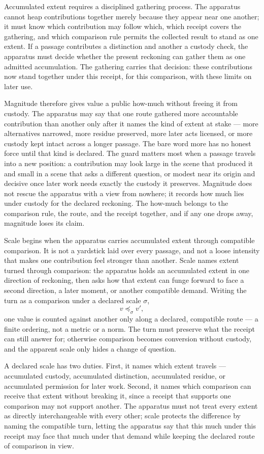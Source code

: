 Accumulated extent requires a disciplined gathering process. The apparatus cannot heap contributions together merely because they appear near one another; it must know which contribution may follow which, which receipt covers the gathering, and which comparison rule permits the collected result to stand as one extent. If a passage contributes a distinction and another a custody check, the apparatus must decide whether the present reckoning can gather them as one admitted accumulation. The gathering carries that decision: these contributions now stand together under this receipt, for this comparison, with these limits on later use.

Magnitude therefore gives value a public how-much without freeing it from custody. The apparatus may say that one route gathered more accountable contribution than another only after it names the kind of extent at stake --- more alternatives narrowed, more residue preserved, more later acts licensed, or more custody kept intact across a longer passage. The bare word more has no honest force until that kind is declared. The guard matters most when a passage travels into a new position: a contribution may look large in the scene that produced it and small in a scene that asks a different question, or modest near its origin and decisive once later work needs exactly the custody it preserves. Magnitude does not rescue the apparatus with a view from nowhere; it records how much lies under custody for the declared reckoning. The how-much belongs to the comparison rule, the route, and the receipt together, and if any one drops away, magnitude loses its claim.

Scale begins when the apparatus carries accumulated extent through compatible comparison. It is not a yardstick laid over every passage, and not a loose intensity that makes one contribution feel stronger than another. Scale names extent turned through comparison: the apparatus holds an accumulated extent in one direction of reckoning, then asks how that extent can funge forward to face a second direction, a later moment, or another compatible demand. Writing the turn as a comparison under a declared scale $\sigma$,
\[ v \preceq_{\sigma} v', \]
one value is counted against another only along a declared, compatible route --- a finite ordering, not a metric or a norm. The turn must preserve what the receipt can still answer for; otherwise comparison becomes conversion without custody, and the apparent scale only hides a change of question.

A declared scale has two duties. First, it names which extent travels --- accumulated custody, accumulated distinction, accumulated residue, or accumulated permission for later work. Second, it names which comparison can receive that extent without breaking it, since a receipt that supports one comparison may not support another. The apparatus must not treat every extent as directly interchangeable with every other; scale protects the difference by naming the compatible turn, letting the apparatus say that this much under this receipt may face that much under that demand while keeping the declared route of comparison in view.

